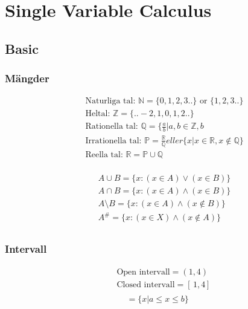 \chapter{Single Variable Calculus}

\newpage

\section{Basic}
\subsection{Mängder}
\begin{align*}
  &\quad \text{Naturliga tal: } \mathbb{N} = \{0, 1, 2 , 3 ..  \} \text{ or } \{1, 2 , 3 ..  \} \\
  &\quad \text{Heltal: }\mathbb{Z} = \{.. -2, 1, 0, 1, 2 ..  \} \\
  &\quad \text{Rationella tal: }\mathbb{Q} = \{ \frac{a}{b} | a,b \in \mathbb{Z}, b \\
  &\quad \text{Irrationella tal: }\mathbb{P} = \frac{\mathbb{R}}{\mathbb{Q}}eller \{ x | x \in \mathbb{R}, x \notin \mathbb{Q} \} \\
  &\quad \text{Reella tal: }\mathbb{R} =  \mathbb{P} \cup \mathbb{Q} \\
\end{align*}

\begin{align*}
  &\quad A \cup B = \{ x:(x \in A) \lor (x \in B)\} \\
  &\quad A \cap B = \{ x:(x \in A) \land (x \in B)\} \\
  &\quad A \setminus B = \{ x:(x \in A) \land (x \notin B)\} \\
  &\quad A^{\text{\#}} = \{ x:(x \in X) \land (x \notin A)\} \\
\end{align*}


\newpage

\subsection{Intervall}
\begin{align*}
  &\quad \text{Open intervall} = (1,4) \\
  &\quad \text{Closed intervall} = [ \, 1,4 ] \, \\
\end{align*}
\begin{equation}
[ \, a, b ] \, = \{ x | a \leq x \leq b \}
\end{equation}

